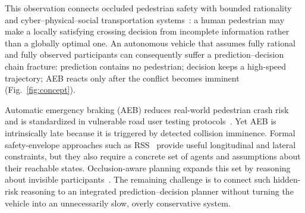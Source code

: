 \documentclass[journal]{IEEEtran}
\begin{document}
This observation connects occluded pedestrian safety with bounded rationality~\cite{simon1955behavioral} and cyber--physical--social transportation systems~\cite{wang2010parallel,wang2017parallel,wang2024parallel}: a human pedestrian may make a locally satisfying crossing decision from incomplete information rather than a globally optimal one. An autonomous vehicle that assumes fully rational and fully observed participants can consequently suffer a prediction--decision chain fracture: prediction contains no pedestrian; decision keeps a high-speed trajectory; AEB reacts only after the conflict becomes imminent (Fig.~\ref{fig:concept}).

Automatic emergency braking (AEB) reduces real-world pedestrian crash risk and is standardized in vulnerable road user testing protocols~\cite{euroncap2024,cicchino2022effects}. Yet AEB is intrinsically late because it is triggered by detected collision imminence. Formal safety-envelope approaches such as RSS~\cite{shalev2017rss} provide useful longitudinal and lateral constraints, but they also require a concrete set of agents and assumptions about their reachable states. Occlusion-aware planning expands this set by reasoning about invisible participants~\cite{orzechowski2018tackling,koschi2021setbased,nager2019shadows,schratter2019occlusion,chen2023quantified,park2023reachability}. The remaining challenge is to connect such hidden-risk reasoning to an integrated prediction--decision planner without turning the vehicle into an unnecessarily slow, overly conservative system.
\end{document}
